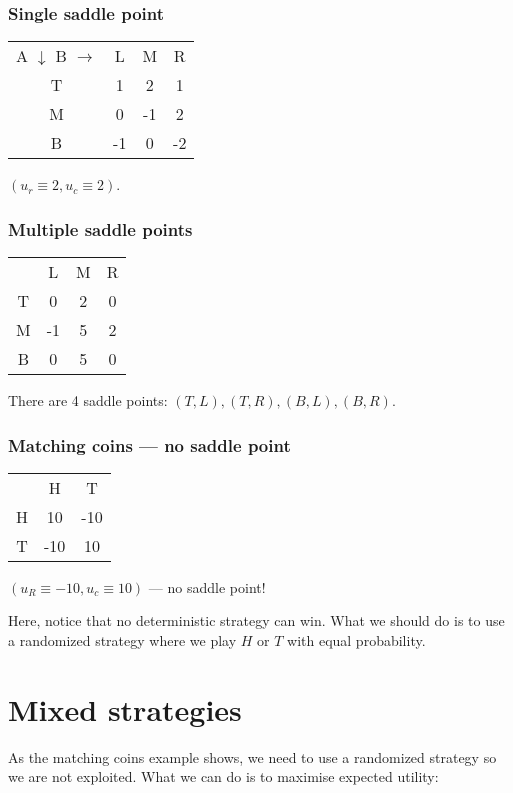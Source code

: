 \documentclass[11pt]{book}
\begin{document}
\subsubsection{Single saddle point}

\begin{tabular}{cccc}
    \footnotesize{A $\downarrow$ B $\rightarrow$} & L & M & R \\
    T & 1 & 2 & 1 \\
    M & 0 & -1 & 2 \\
    B & -1 & 0 & -2 \\
\end{tabular}
$(u_r \equiv 2, u_c \equiv 2)$.

\subsubsection{Multiple saddle points}

\begin{tabular}{cccc}
    & L & M & R \\
    T & 0 & 2 & 0 \\
    M & -1 & 5 & 2 \\
    B & 0 & 5 & 0 \\
\end{tabular}
There are 4 saddle points: $(T, L), (T, R), (B, L), (B, R)$.


\subsubsection{Matching coins --- no saddle point}

\begin{tabular}{ccc}
      & H & T \\
    H & 10 & -10 \\
    T & -10 & 10
\end{tabular}
$(u_R \equiv -10, u_c \equiv 10)$ --- no saddle point!

Here, notice that no deterministic strategy can win. What we should do is to
use a randomized strategy where we play $H$ or $T$ with equal probability.

\section{Mixed strategies}

As the matching coins example shows, we need to use a randomized strategy
so we are not exploited. What we can do is to maximise expected utility:
\end{document}
